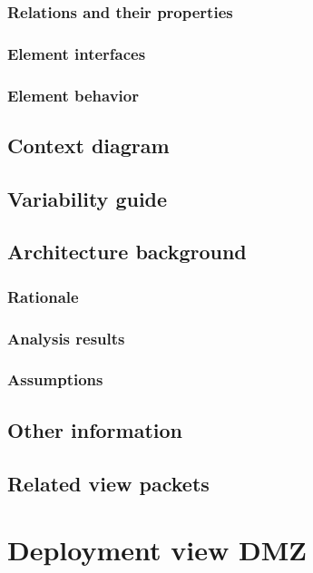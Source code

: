 \documentclass[a4paper,10pt]{paper}
\begin{document}
\subsubsection{Relations and their properties}

\subsubsection{Element interfaces}

\subsubsection{Element behavior}

\subsection{Context diagram}

\subsection{Variability guide}

\subsection{Architecture background}

\subsubsection{Rationale}

\subsubsection{Analysis results}

\subsubsection{Assumptions}

\subsection{Other information}

\subsection{Related view packets}


\section{Deployment view DMZ}
\end{document}
